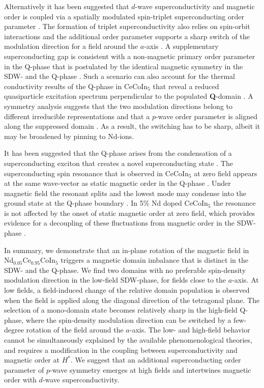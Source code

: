 \documentclass[article,twocolumn,showpacs,preprintnumbers,amsmath,amssymb, superscriptaddress]{revtex4-1}
\begin{document}
Alternatively it has been suggested that $d$-wave superconductivity and magnetic order is coupled via a spatially modulated spin-triplet superconducting order parameter \cite{Agterberg2009, Hosoya2017}. The formation of triplet superconductivity also relies on spin-orbit interactions and the additional order parameter supports a sharp switch of the modulation direction for a field around the $a$-axis \cite{Agterberg2009, Gerber2014}. A supplementary superconducting gap is consistent with a non-magnetic primary order parameter in the Q-phase that is postulated by the identical magnetic symmetry in the SDW- and the Q-phase \cite{Mazzone2017}. Such a scenario can also account for the thermal conductivity results of the Q-phase in CeCoIn$_5$ that reveal a reduced quasiparticle excitation spectrum perpendicular to the populated \textbf{Q}-domain \cite{Kim2016}. A symmetry analysis suggests that the two modulation directions belong to different irreducible representations and that a $p$-wave order parameter is aligned along the suppressed domain \cite{Gerber2014, Kim2016}. As a result, the switching has to be sharp, albeit it may be broadened by pinning to Nd-ions.

It has been suggested that the Q-phase arises from the condensation of a superconducting exciton that creates a novel superconducting state \cite{Michal2011}. The superconducting spin resonance that is observed in CeCoIn$_5$ at zero field appears at the same wave-vector as static magnetic order in the Q-phase \cite{Raymond2015}. Under magnetic field the resonant splits and the lowest mode may condense into the ground state at the Q-phase boundary \cite{Michal2011, Stock2012, Raymond2012, Akbari2012}. In 5\% Nd doped CeCoIn$_5$ the resonance is not affected by the onset of static magnetic order at zero field, which provides evidence for a decoupling of these fluctuations from magnetic order in the SDW-phase \cite{Mazzone20172}.

In summary, we demonstrate that an in-plane rotation of the magnetic field in Nd$_{0.05}$Ce$_{0.95}$CoIn$_5$ triggers a magnetic domain imbalance that is distinct in the SDW- and the Q-phase. We find two domains with no preferable spin-density modulation direction in the low-field SDW-phase, for fields close to the $a$-axis. At low fields, a field-induced change of the relative domain population is observed when the field is applied along the diagonal direction of the tetragonal plane.  The selection of a mono-domain state becomes relatively sharp in the high-field Q-phase, where the spin-density modulation direction can be switched by a few-degree rotation of the field around the $a$-axis. The low- and high-field behavior cannot be simultaneously explained by the available phenomenological theories, and requires a modification in the coupling between superconductivity and magnetic order at $H^*$. We suggest that an additional superconducting order parameter of $p$-wave symmetry emerges at high fields and intertwines magnetic order with $d$-wave superconductivity. 
\end{document}
